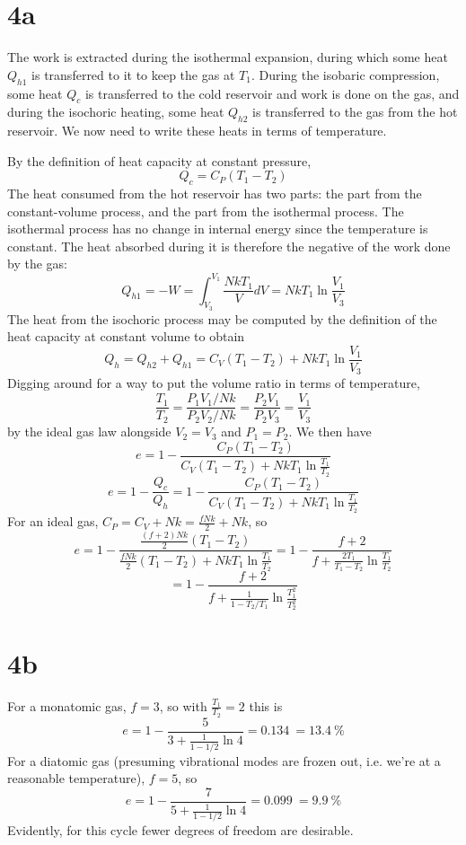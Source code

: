 \documentclass{article}
\begin{document}
\section*{4a}
The work is extracted during the isothermal expansion, during which some heat $Q_{h1}$ is transferred to it to keep the gas at $T_{1}$.
During the isobaric compression, some heat $Q_{c}$ is transferred to the cold reservoir and work is done on the gas, and during the isochoric heating, some heat $Q_{h2}$ is transferred to the gas from the hot reservoir.
We now need to write these heats in terms of temperature.

By the definition of heat capacity at constant pressure,
\[Q_{c}=C_{P}(T_{1}-T_{2})\]
The heat consumed from the hot reservoir has two parts: the part from the constant-volume process, and the part from the isothermal process. The isothermal process has no change in internal energy since the temperature is constant. The heat absorbed during it is therefore the negative of the work done by the gas:
\[Q_{h1}=-W=\int_{V_{3}}^{V_{1}}\frac{NkT_{1}}{V}dV=NkT_{1}\ln\frac{V_{1}}{V_{3}}\]
The heat from the isochoric process may be computed by the definition of the heat capacity at constant volume to obtain
\[Q_{h}=Q_{h2}+Q_{h1}=C_{V}(T_{1}-T_{2})+NkT_{1}\ln\frac{V_{1}}{V_{3}}\]
Digging around for a way to put the volume ratio in terms of temperature,
\[\frac{T_{1}}{T_{2}}=\frac{P_{1}V_{1}/Nk}{P_{2}V_{2}/Nk}=\frac{P_{2}V_{1}}{P_{2}V_{3}}=\frac{V_{1}}{V_{3}}\]
by the ideal gas law alongside $V_{2}=V_{3}$ and $P_{1}=P_{2}$.
We then have
\[ e=1-\frac{C_{P}(T_{1}-T_{2})}{C_{V}(T_{1}-T_{2})+NkT_{1}\ln\frac{T_{1}}{T_{2}}}\]
\[e=1-\frac{Q_{c}}{Q_{h}}=1-\frac{C_{P}(T_{1}-T_{2})}{C_{V}(T_{1}-T_{2})+NkT_{1}\ln\frac{T_{1}}{T_{2}}}\]
For an ideal gas, $C_{P}=C_{V}+Nk=\frac{fNk}{2}+Nk$, so
\[ e=1-\frac{\frac{(f+2)Nk}{2}(T_{1}-T_{2})}{\frac{fNk}{2}(T_{1}-T_{2})+NkT_{1}\ln\frac{T_{1}}{T_{2}}}=1-\frac{f+2}{f+\frac{2T_{1}}{T_{1}-T_{2}}\ln\frac{T_{1}}{T_{2}}}\]
\[=1-\frac{f+2}{f+\frac{1}{1-T_{2}/T_{1}}\ln\frac{T_{1}^{2}}{T_{2}^{2}}}\]

\section*{4b}
For a monatomic gas, $f=3$, so with $\frac{T_{1}}{T_{2}}=2$ this is
\[e=1-\frac{5}{3+\frac{1}{1-1/2}\ln 4}=\SI{0.134}{}=\SI{13.4}{\% }\]
For a diatomic gas (presuming vibrational modes are frozen out, i.e. we're at a reasonable temperature), $f=5$, so
\[e=1-\frac{7}{5+\frac{1}{1-1/2}\ln 4}=\SI{0.099}{=\SI{9.9}{\%}}\]
Evidently, for this cycle fewer degrees of freedom are desirable.
\end{document}
